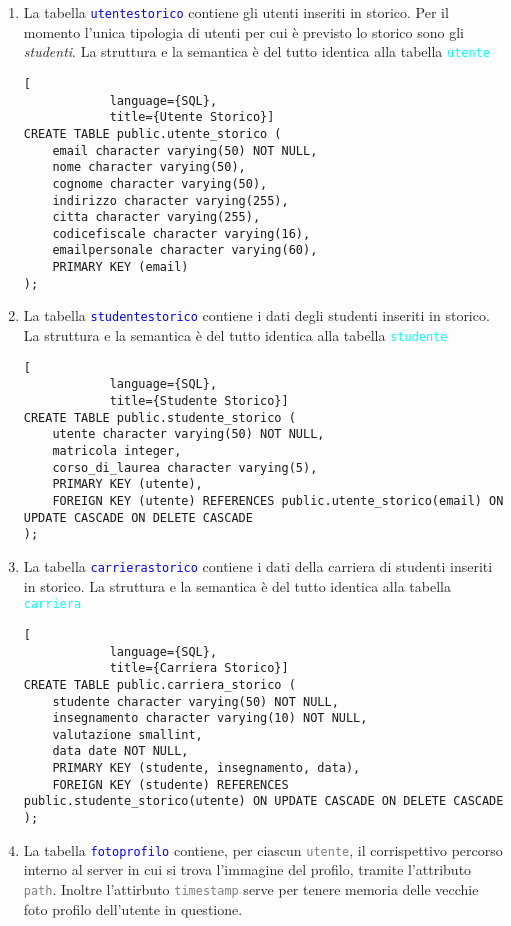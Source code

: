 \documentclass{article}
\newcommand{\tabb}[1]{\texttt{\textcolor{blue}{#1}}}
\newcommand{\tab}[1]{\texttt{\textcolor{cyan}{#1}}}
\newcommand{\attr}[1]{\texttt{\textcolor{gray}{#1}}}
\newcommand{\und}[0]{\textunderscore}
\begin{document}
\begin{enumerate}
        \item La tabella \tabb{utente\und storico} contiene gli utenti inseriti in storico. Per il momento l'unica tipologia di utenti per cui è previsto lo storico sono gli \textit{studenti}. La struttura e la semantica è del tutto identica alla tabella \tab{utente}
        \begin{lstlisting}[
            language={SQL},
            title={Utente Storico}]
CREATE TABLE public.utente_storico (
    email character varying(50) NOT NULL,
    nome character varying(50),
    cognome character varying(50),
    indirizzo character varying(255),
    citta character varying(255),
    codicefiscale character varying(16),
    emailpersonale character varying(60),
    PRIMARY KEY (email)
);
        \end{lstlisting}

        \item La tabella \tabb{studente\und storico} contiene i dati degli studenti inseriti in storico. La struttura e la semantica è del tutto identica alla tabella \tab{studente}
        \begin{lstlisting}[
            language={SQL},
            title={Studente Storico}]
CREATE TABLE public.studente_storico (
    utente character varying(50) NOT NULL,
    matricola integer,
    corso_di_laurea character varying(5),
    PRIMARY KEY (utente),
    FOREIGN KEY (utente) REFERENCES public.utente_storico(email) ON UPDATE CASCADE ON DELETE CASCADE
);
        \end{lstlisting}

        \item La tabella \tabb{carriera\und storico} contiene i dati della carriera di studenti inseriti in storico. La struttura e la semantica è del tutto identica alla tabella \tab{carriera}
        \begin{lstlisting}[
            language={SQL},
            title={Carriera Storico}]
CREATE TABLE public.carriera_storico (
    studente character varying(50) NOT NULL,
    insegnamento character varying(10) NOT NULL,
    valutazione smallint,
    data date NOT NULL,
    PRIMARY KEY (studente, insegnamento, data),
    FOREIGN KEY (studente) REFERENCES public.studente_storico(utente) ON UPDATE CASCADE ON DELETE CASCADE
);
        \end{lstlisting}

        \item La tabella \tabb{foto\und profilo} contiene, per ciascun \attr{utente}, il corrispettivo percorso interno al server in cui si trova l'immagine del profilo, tramite l'attributo \attr{path}. Inoltre l'attirbuto \attr{timestamp} serve per tenere memoria delle vecchie foto profilo dell'utente in questione.


\end{enumerate}
\end{document}
